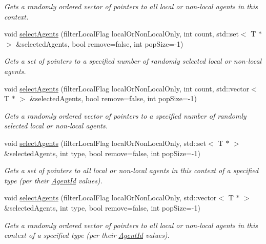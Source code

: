 \begin{DoxyCompactItemize}
\begin{DoxyCompactList}\small\item\em Gets a randomly ordered vector of pointers to all local or non-\/local agents in this context. \end{DoxyCompactList}\item 
void \hyperlink{classrepast_1_1_shared_context_a2c3cac3805fbc40672afcefde05552a1}{select\-Agents} (filter\-Local\-Flag local\-Or\-Non\-Local\-Only, int count, std\-::set$<$ T $\ast$ $>$ \&selected\-Agents, bool remove=false, int pop\-Size=-\/1)
\begin{DoxyCompactList}\small\item\em Gets a set of pointers to a specified number of randomly selected local or non-\/local agents. \end{DoxyCompactList}\item 
void \hyperlink{classrepast_1_1_shared_context_a3fa1044d2fe41b97a0c6ee98d650d456}{select\-Agents} (filter\-Local\-Flag local\-Or\-Non\-Local\-Only, int count, std\-::vector$<$ T $\ast$ $>$ \&selected\-Agents, bool remove=false, int pop\-Size=-\/1)
\begin{DoxyCompactList}\small\item\em Gets a randomly ordered vector of pointers to a specified number of randomly selected local or non-\/local agents. \end{DoxyCompactList}\item 
void \hyperlink{classrepast_1_1_shared_context_a52c6ac3c380cc8e6c9f7abc91305182d}{select\-Agents} (filter\-Local\-Flag local\-Or\-Non\-Local\-Only, std\-::set$<$ T $\ast$ $>$ \&selected\-Agents, int type, bool remove=false, int pop\-Size=-\/1)
\begin{DoxyCompactList}\small\item\em Gets a set of pointers to all local or non-\/local agents in this context of a specified type (per their \hyperlink{classrepast_1_1_agent_id}{Agent\-Id} values). \end{DoxyCompactList}\item 
void \hyperlink{classrepast_1_1_shared_context_a23250171a02f92878c4b8e6f195f1b0d}{select\-Agents} (filter\-Local\-Flag local\-Or\-Non\-Local\-Only, std\-::vector$<$ T $\ast$ $>$ \&selected\-Agents, int type, bool remove=false, int pop\-Size=-\/1)
\begin{DoxyCompactList}\small\item\em Gets a randomly ordered vector of pointers to all local or non-\/local agents in this context of a specified type (per their \hyperlink{classrepast_1_1_agent_id}{Agent\-Id} values). \end{DoxyCompactList}\item 

\end{DoxyCompactItemize}

